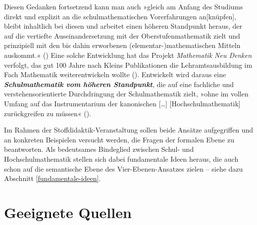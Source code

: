 \documentclass[
]{scrbook}
\theoremstyle{definition}
\theoremstyle{definition}
\theoremstyle{definition}
\theoremstyle{definition}
\theoremstyle{remark}
\begin{document}
Diesen Gedanken fortsetzend kann man auch »gleich am Anfang des Studiums direkt und explizit an die schulmathematischen Vorerfahrungen an{[}knüpfen{]}, bleibt inhaltlich bei diesen und arbeitet einen höheren Standpunkt heraus, der auf die vertiefte Auseinandersetzung mit der Oberstufenmathematik zielt und prinzipiell mit den bis dahin erworbenen (elementar-)mathematischen Mitteln auskommt.« () Eine solche Entwicklung hat das Projekt \emph{Mathematik Neu Denken} verfolgt, das gut 100 Jahre nach Kleins Publikationen die Lehramtsausbildung im Fach Mathematik weiterentwickeln wollte (). Entwickelt wird daraus eine \textbf{\emph{Schulmathematik vom höheren Standpunkt}}, die auf eine fachliche und verstehensorientierte Durchdringung der Schulmathematik zielt, »ohne im vollen Umfang auf das Instrumentarium der kanonischen {[}\ldots{]} {[}Hochschulmathematik{]} zurückgreifen zu müssen« ().

Im Rahmen der Stoffdidaktik-Veranstaltung sollen beide Ansätze aufgegriffen und an konkreten Beispielen versucht werden, die Fragen der \textcolor{formalColor}{formalen Ebene} zu beantworten. Als bedeutsames Bindeglied zwischen Schul- und Hochschulmathematik stellen sich dabei fundamentale Ideen heraus, die auch schon auf die \textcolor{semanticColor}{semantische Ebene} des Vier-Ebenen-Ansatzes zielen -- siehe dazu Abschnitt \ref{fundamentale-ideen}.

\section{Geeignete Quellen}\label{geeignete-quellen}
\end{document}
